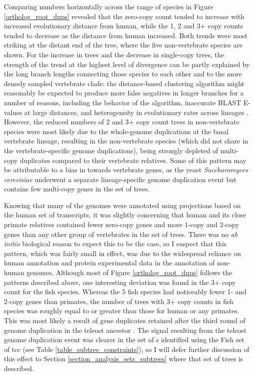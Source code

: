 Comparing numbers horizontally across the range of species in Figure
\ref{ortholog_root_dups} revealed that the zero-copy count tended to
increase with increased evolutionary distance from human, while the 1,
2 and 3+ copy counts tended to decrease as the distance from human
increased. Both trends were most striking at the distant end of the
tree, where the five non-vertebrate species are shown. For the
increase in \zcop trees and the decrease in single-copy trees, the
strength of the trend at the highest level of divergence can be partly
explained by the long branch lengths connecting those species to each
other and to the more densely sampled vertebrate clade: the
distance-based clustering algorithm might reasonably be expected to
produce more false negatives in longer branches for a number of
reasons, including the behavior of the \hclust algorithm, inaccurate
BLAST E-values at large distances, and heterogeneity in evolutionary
rates across lineages \citep{Whelan2008}. However, the reduced numbers
of 2 and 3+ copy count trees in non-vertebrate species were most
likely due to the whole-genome duplications at the basal vertebrate
lineage, resulting in the non-vertebrate species (which did not share
in the vertebrate-specific genome duplications), being strongly
depleted of multi-copy duplicates compared to their vertebrate
relatives. Some of this pattern may be attributable to a bias in \ens
towards vertebrate genes, as the yeast \emph{Saccharomyces cerevisiae}
underwent a separate lineage-specific genome duplication event
\citep{Kellis2004} but contains few multi-copy genes in the set of
\cmp trees.

Knowing that many of the \lcv genomes were annotated using projections
based on the human set of transcripts, it was slightly concerning that
human and its close primate relatives contained fewer zero-copy genes
and more 1-copy and 2-copy genes than any other group of vertebrates
in the \cmp set of trees. There was no \emph{ab initio} biological
reason to expect this to be the case, so I suspect that this pattern,
which was fairly small in effect, was due to the widespread reliance
on human annotation and protein experimental data in the annotation of
non-human genomes. Although most of Figure \ref{ortholog_root_dups}
follows the patterns described above, one interesting deviation was
found in the 3+ copy count for the fish species. Whereas the 5 fish
species had noticeably fewer 1- and 2-copy genes than primates, the
number of trees with 3+ copy counts in fish species was roughly equal
to or greater than those for human or any primates. This was most
likely a result of gene duplicates retained after the third round of
genome duplication in the teleost ancestor \citep{Jaillon2004}. The
signal resulting from the teleost genome duplication event was clearer
in the set of \subtr{}s identified using the Fish set of \ac{tcc} (see
Table \ref{table_subtree_constraints}), so I will defer further
discussion of this effect to Section
\ref{section_analysis_sets_subtrees} where that set of trees is
described.


